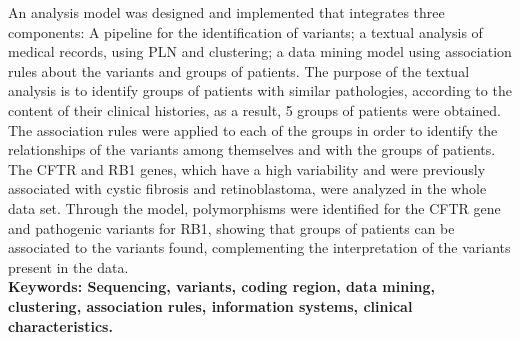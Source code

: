 An analysis model was designed and implemented that integrates three components: A pipeline for the identification of variants; a textual analysis of medical records, using PLN and clustering; a data mining model using association rules about the variants and groups of patients. The purpose of the textual analysis is to identify groups of patients with similar pathologies, according to the content of their clinical histories, as a result, 5 groups of patients were obtained. The association rules were applied to each of the groups in order to identify the relationships of the variants among themselves and with the groups of patients.\\

The CFTR and RB1 genes, which have a high variability and were previously associated with cystic fibrosis and retinoblastoma, were analyzed in the whole data set. Through the model, polymorphisms were identified for the CFTR gene and pathogenic variants for RB1, showing that groups of patients can be associated to the variants found, complementing the interpretation of the variants present in the data.\\

\textbf{\small Keywords: Sequencing, variants, coding region, data mining, clustering, association rules, information systems, clinical characteristics.}\\